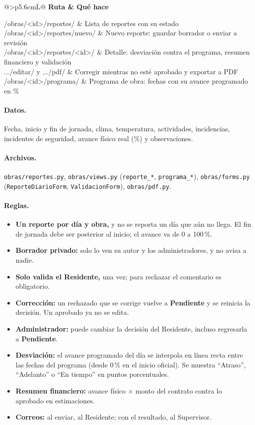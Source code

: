 \documentclass[11pt,letterpaper]{article}
\makeatletter
\newcommand{\cod}[1]{\texttt{\small #1}}
\newcommand{\estatus}[1]{{\sffamily\small\bfseries #1}}
\newcommand{\rutas}[1]{%
\begin{center}\small\rowcolors{2}{grisfondo}{white}
\begin{tabularx}{\linewidth}{@{}>{\ttfamily\footnotesize}p{5.6cm}L@{}}
\toprule\normalfont\sffamily\bfseries Ruta & \sffamily\bfseries Qué hace\\\midrule
#1
\bottomrule\end{tabularx}\end{center}}
\makeatother
\begin{document}
\rutas{
/obras/<id>/reportes/ & Lista de reportes con su estado\\
/obras/<id>/reportes/nuevo/ & Nuevo reporte: guardar borrador o enviar a revisión\\
/obras/<id>/reportes/<id>/ & Detalle: desviación contra el programa, resumen financiero y validación\\
.../editar/ y .../pdf/ & Corregir mientras no esté aprobado y exportar a PDF\\
/obras/<id>/programa/ & Programa de obra: fechas con su avance programado en \%\\
}

\paragraph{Datos.} Fecha, inicio y fin de jornada, clima, temperatura, actividades, incidencias, incidentes de seguridad, avance físico real (\%) y observaciones.

\paragraph{Archivos.} \cod{obras/reportes.py}, \cod{obras/views.py} (\cod{reporte\_*}, \cod{programa\_*}), \cod{obras/forms.py} (\cod{ReporteDiarioForm}, \cod{ValidacionForm}), \cod{obras/pdf.py}.

\paragraph{Reglas.}
\begin{itemize}
  \item \textbf{Un reporte por día y obra,} y no se reporta un día que aún no llega. El fin de jornada debe ser posterior al inicio; el avance va de 0 a 100\,\%.
  \item \textbf{Borrador privado:} solo lo ven su autor y los administradores, y no avisa a nadie.
  \item \textbf{Solo valida el Residente,} una vez; para rechazar el comentario es obligatorio.
  \item \textbf{Corrección:} un rechazado que se corrige vuelve a \estatus{Pendiente} y se reinicia la decisión. Un aprobado ya no se edita.
  \item \textbf{Administrador:} puede cambiar la decisión del Residente, incluso regresarla a \estatus{Pendiente}.
  \item \textbf{Desviación:} el avance programado del día se interpola en línea recta entre las fechas del programa (desde 0\,\% en el inicio oficial). Se muestra \enquote{Atraso}, \enquote{Adelanto} o \enquote{En tiempo} en puntos porcentuales.
  \item \textbf{Resumen financiero:} avance físico × monto del contrato contra lo aprobado en estimaciones.
  \item \textbf{Correos:} al enviar, al Residente; con el resultado, al Supervisor.
\end{itemize}
\end{document}

